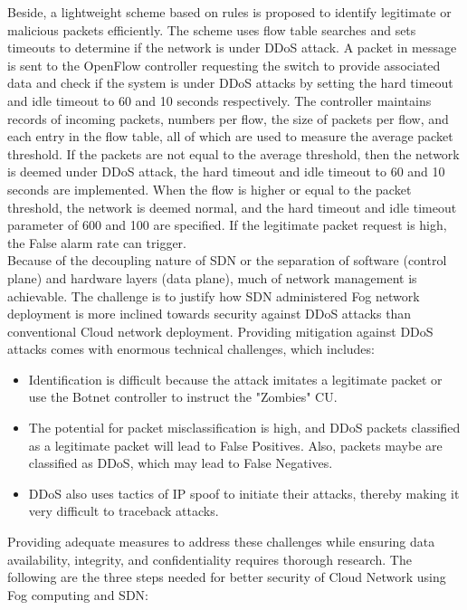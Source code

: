 \documentclass{ijitcs}
\begin{document}
Beside, a lightweight scheme based on rules is proposed to identify legitimate or malicious packets efficiently. The scheme uses flow table searches and sets timeouts to determine if the network is under DDoS attack. A packet in message is sent to the OpenFlow controller
requesting the switch to provide associated data and check if the system is under DDoS attacks by setting the hard timeout and idle timeout to 60 and 10 seconds respectively. The controller maintains records of incoming packets, numbers per flow, the size of packets per flow, and each entry in the flow table, all of which are used to measure the average packet threshold. If the packets are not equal to the average threshold, then the network is deemed under DDoS attack, the hard timeout and idle timeout to 60 and 10 seconds are implemented. When the flow is higher or equal to the packet threshold, the network is deemed normal, and the hard timeout and idle timeout parameter of 600 and 100
are specified. If the legitimate packet request is high, the False alarm rate can trigger. \\
Because of the decoupling nature of SDN or the separation of software (control plane) and hardware layers (data plane), much of network management is
achievable. The challenge is to justify how SDN administered Fog network deployment is more inclined towards security against DDoS attacks than conventional Cloud network deployment. Providing mitigation against DDoS attacks comes with enormous technical challenges, which includes:
\begin{itemize}
    \item Identification is difficult because the attack imitates a legitimate packet or use the Botnet controller to instruct the "Zombies" CU.
    \item The potential for packet misclassification is high, and DDoS packets classified as a legitimate packet will lead to False Positives. Also, packets maybe are classified as DDoS, which may lead to False Negatives.
    \item DDoS also uses tactics of IP spoof to initiate their attacks, thereby making it very difficult to traceback attacks.
\end{itemize}
Providing adequate measures to address these challenges
while ensuring data availability, integrity, and confidentiality requires thorough research. The following are the three steps needed for better security of Cloud Network using Fog computing and SDN:
\end{document}
